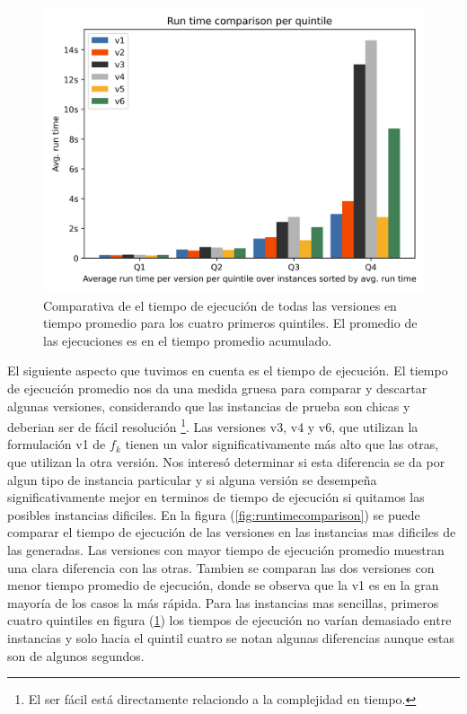 \documentclass{article}
\begin{document}
  \begin{figure}[h!]
    \centering
    \includegraphics[width=12cm]{../resources/run_time_comparsion_by_quintile.png}
      \caption{Comparativa de el tiempo de ejecución de todas las versiones en tiempo promedio para los cuatro primeros quintiles. El promedio de las ejecuciones es en el tiempo promedio acumulado.}
    \label{fig:firstfourquintiles}
  \end{figure}

  El siguiente aspecto que tuvimos en cuenta es el tiempo de ejecución. El tiempo de ejecución promedio nos da una medida gruesa para comparar y descartar algunas versiones, considerando que las instancias de prueba son chicas y deberian ser de fácil resolución \footnote{El ser fácil está directamente relaciondo a la complejidad en tiempo.}. Las versiones v3, v4 y v6, que utilizan la formulación v1 de $f_k$ tienen un valor significativamente más alto que las otras, que utilizan la otra versión. Nos interesó determinar si esta diferencia se da por algun tipo de instancia particular y si alguna versión se desempeña significativamente mejor en terminos de tiempo de ejecución si quitamos las posibles instancias dificiles. En la figura (\ref{fig:runtimecomparison}) se puede comparar el tiempo de ejecución de las versiones en las instancias mas dificiles de las generadas. Las versiones con mayor tiempo de ejecución promedio muestran una clara diferencia con las otras. Tambien se comparan las dos versiones con menor tiempo promedio de ejecución, donde se observa que la v1 es en la gran mayoría de los casos la más rápida. Para las instancias mas sencillas, primeros cuatro quintiles en figura (\ref{fig:firstfourquintiles}) los tiempos de ejecución no varían demasiado entre instancias y solo hacia el quintil cuatro se notan algunas diferencias aunque estas son de algunos segundos.
\end{document}

